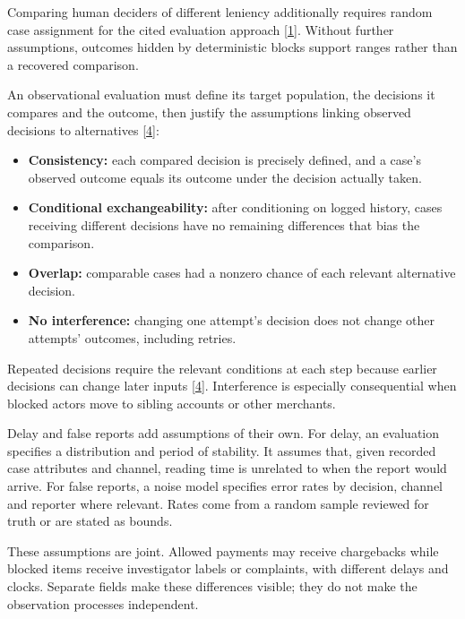 \documentclass[
  11pt,
]{article}
\providecommand{\tightlist}{%
  \setlength{\itemsep}{0pt}\setlength{\parskip}{0pt}}
\renewcommand{\tightlist}{\setlength{\itemsep}{0pt plus 1pt}\setlength{\parskip}{0pt}}
\begin{document}
Comparing human deciders of different leniency additionally requires
random case assignment for the cited evaluation approach
{[}\protect\hyperlink{ref-Lakkaraju2017Selective}{1}{]}. Without further
assumptions, outcomes hidden by deterministic blocks support ranges
rather than a recovered comparison.

An observational evaluation must define its target population, the
decisions it compares and the outcome, then justify the assumptions
linking observed decisions to alternatives
{[}\protect\hyperlink{ref-HernanRobins2020}{4}{]}:

\begin{itemize}
\tightlist
\item
  \textbf{Consistency:} each compared decision is precisely defined, and
  a case's observed outcome equals its outcome under the decision
  actually taken.
\item
  \textbf{Conditional exchangeability:} after conditioning on logged
  history, cases receiving different decisions have no remaining
  differences that bias the comparison.
\item
  \textbf{Overlap:} comparable cases had a nonzero chance of each
  relevant alternative decision.
\item
  \textbf{No interference:} changing one attempt's decision does not
  change other attempts' outcomes, including retries.
\end{itemize}

Repeated decisions require the relevant conditions at each step because
earlier decisions can change later inputs
{[}\protect\hyperlink{ref-HernanRobins2020}{4}{]}. Interference is
especially consequential when blocked actors move to sibling accounts or
other merchants.

Delay and false reports add assumptions of their own. For delay, an
evaluation specifies a distribution and period of stability. It assumes
that, given recorded case attributes and channel, reading time is
unrelated to when the report would arrive. For false reports, a noise
model specifies error rates by decision, channel and reporter where
relevant. Rates come from a random sample reviewed for truth or are
stated as bounds.

These assumptions are joint. Allowed payments may receive chargebacks
while blocked items receive investigator labels or complaints, with
different delays and clocks. Separate fields make these differences
visible; they do not make the observation processes independent.
\end{document}
